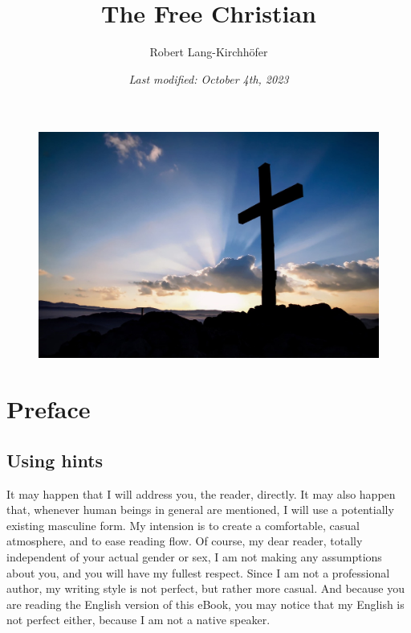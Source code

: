 \documentclass[12pt,a4paper]{article}
\title{\textbf{The Free Christian}}
\author{Robert Lang-Kirchh\"ofer}
\date{\textit{Last modified: October 4th, 2023}}
\begin{document}
	\setlength{\parindent}{0mm}
	\maketitle
	\begin{figure}[h]
		\centering
		\includegraphics[width=1\textwidth,keepaspectratio]{"FreeChristian.jpeg"}
	\end{figure}

	\newpage
	\tableofcontents

	\newpage
	\section{Preface}

	\subsection{Using hints}
		It may happen that I will address you,
		the reader,
		directly.
		It may also happen that,
		whenever human beings in general are mentioned,
		I will use a potentially existing masculine form.
		My intension is to create a comfortable,
		casual atmosphere,
		and to ease reading flow.
		Of course,
		my dear reader,
		totally independent of your actual gender or sex,
		I am not making any assumptions about you,
		and you will have my fullest respect.
		Since I am not a professional author,
		my writing style is not perfect,
		but rather more casual.
		And because you are reading the English version of this eBook,
		you may notice that my English is not perfect either,
		because I am not a native speaker.
		
\end{document}
